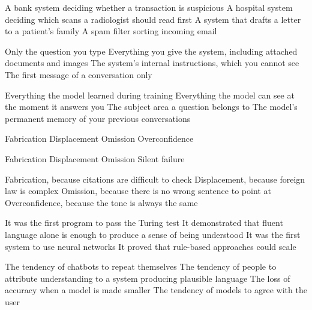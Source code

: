 \documentclass[11pt,a4paper]{article}
\begin{document}

\begin{questions}

  {A bank system deciding whether a transaction is suspicious}
  {A hospital system deciding which scans a radiologist should read first}
  {A system that drafts a letter to a patient's family}
  {A spam filter sorting incoming email}

  {Only the question you type}
  {Everything you give the system, including attached documents and images}
  {The system's internal instructions, which you cannot see}
  {The first message of a conversation only}

  {Everything the model learned during training}
  {Everything the model can see at the moment it answers you}
  {The subject area a question belongs to}
  {The model's permanent memory of your previous conversations}

  {Fabrication}
  {Displacement}
  {Omission}
  {Overconfidence}

  {Fabrication}
  {Displacement}
  {Omission}
  {Silent failure}

  {Fabrication, because citations are difficult to check}
  {Displacement, because foreign law is complex}
  {Omission, because there is no wrong sentence to point at}
  {Overconfidence, because the tone is always the same}

  {It was the first program to pass the Turing test}
  {It demonstrated that fluent language alone is enough to produce a sense of being understood}
  {It was the first system to use neural networks}
  {It proved that rule-based approaches could scale}

  {The tendency of chatbots to repeat themselves}
  {The tendency of people to attribute understanding to a system producing plausible language}
  {The loss of accuracy when a model is made smaller}
  {The tendency of models to agree with the user}


\end{questions}
\end{document}
